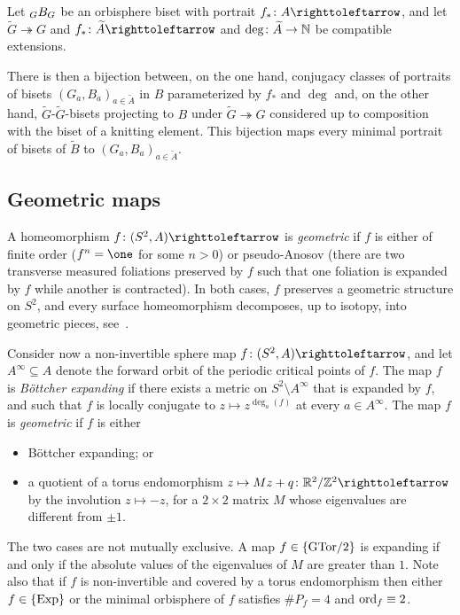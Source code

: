 \documentclass{amsart}
\newcommand\wtA{{\widetilde A}}
\newcommand\wtB{{\widetilde B}}
\newcommand\wtG{{\widetilde G}}
\begin{document}
\begin{mainthm}[= Theorem~\ref{thm:portrait}]\label{main:thm:A}
  Let $\subscript G B_G$ be an orbisphere biset with portrait
  $f_*\colon A\selfmap$, and let $\wtG\twoheadrightarrow G$ and
  $f_*\colon\wtA\selfmap$ and $\deg\colon\wtA\to\N$ be compatible
  extensions.

  There is then a bijection between, on the one hand, conjugacy
  classes of portraits of bisets $(G_a,B_a)_{a\in\wtA}$ in $B$
  parameterized by $f_*$ and $\deg$ and, on the other hand,
  $\wtG$-$\wtG$-bisets projecting to $B$ under
  $\wtG\twoheadrightarrow G$ considered up to composition with the
  biset of a knitting element. This bijection maps every minimal
  portrait of bisets of $\wtB$ to $(G_a,B_a)_{a\in\wtA}$.
\end{mainthm}

\subsection{Geometric maps}\label{ss:geometric}
A homeomorphism $f\colon (S^2,A)\selfmap$ is \emph{geometric} if $f$
is either of finite order ($f^n=\one$ for some $n>0$) or pseudo-Anosov
(there are two transverse measured foliations preserved by $f$ such
that one foliation is expanded by $f$ while another is contracted). In
both cases, $f$ preserves a geometric structure on $S^2$, and every
surface homeomorphism decomposes, up to isotopy, into geometric
pieces, see~\cite{thurston:surfaces}.

Consider now a non-invertible sphere map $f\colon (S^2,A)\selfmap$,
and let $A^\infty\subseteq A$ denote the forward orbit of the periodic
critical points of $f$. The map $f$ is \emph{B\"ottcher expanding} if
there exists a metric on $S^2\setminus A^\infty$ that is expanded by
$f$, and such that $f$ is locally conjugate to
$z\mapsto z^{\deg_a(f)}$ at every $a\in A^\infty$. The map $f$ is
\emph{geometric} if $f$ is either
\begin{itemize}
\item[\Exp] B\"ottcher expanding; or
\item[\Tor] a quotient of a torus endomorphism
  $z\mapsto M z+q\colon\R^2/\Z^2\selfmap$ by the involution
  $z\mapsto-z$, for a $2\times2$ matrix $M$ whose eigenvalues are
  different from $\pm 1$.
\end{itemize}

The two cases are not mutually exclusive. A map $f\in\{\operatorname{GTor/2}\}$ is
expanding if and only if the absolute values of the eigenvalues of $M$
are greater than $1$. Note also that if $f$ is non-invertible and
covered by a torus endomorphism then either $f\in\{\operatorname{Exp}\}$ or the minimal
orbisphere of $f$ satisfies $\#P_f=4$ and $\operatorname{ord}_f\equiv2$.
\end{document}
